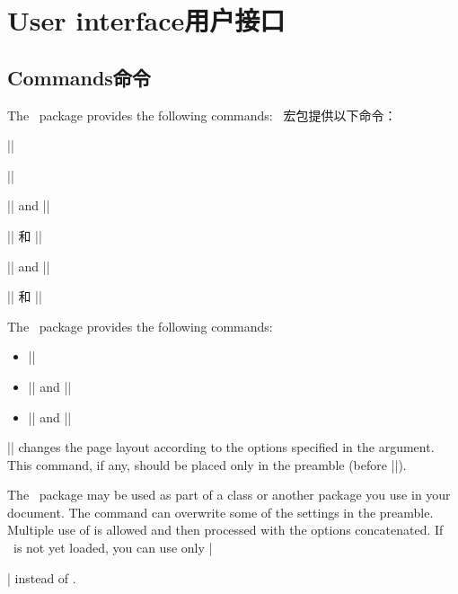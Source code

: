 \section{User interface\hfill 用户接口}

\subsection{Commands\hfill 命令}

\begin{paracol}{2}
The \Gm\ package provides the following commands:
\switchcolumn
\Gm\ 宏包提供以下命令：
\end{paracol}

\begin{itemize}\setlength{\itemsep}{-.5\parsep}
\begin{paracol}{2}
\item ||
\switchcolumn
\item ||

\switchcolumn
\item || and |\restoregeometry|
\switchcolumn
\item || 和 |\restoregeometry|

\switchcolumn
\item || and ||
\switchcolumn
\item || 和 ||
\end{paracol}
\end{itemize}

The \Gm\ package provides the following commands:
\begin{itemize}\setlength{\itemsep}{-.5\parsep}
 \item ||
 \item || and |\restoregeometry|
 \item || and ||
\end{itemize}

||
changes the page layout according to the options specified in the
argument. This command, if any, should be placed only in the
preamble (before ||).

The \Gm\ package may be used as part of a class or another package
you use in your document. The command  can overwrite
some of the settings in the preamble. Multiple use of 
is allowed and then processed with the options concatenated.
If \Gm\ is not yet loaded, you can use only
|\usepackage[||]{geometry}| instead of .

